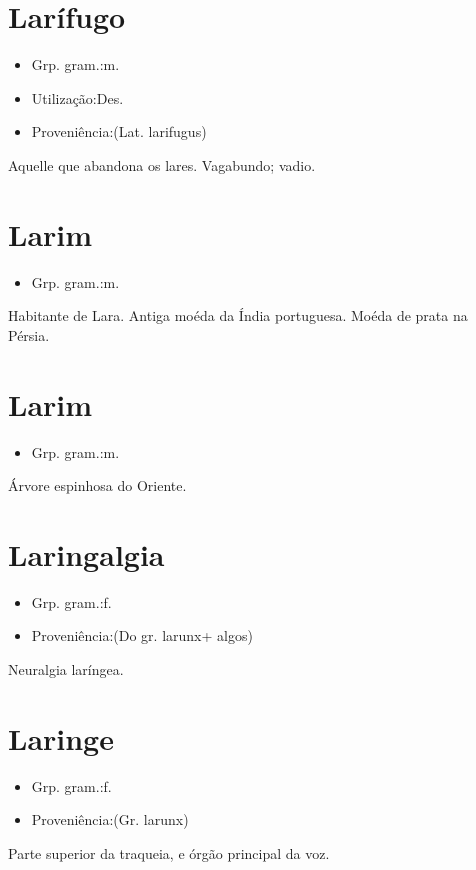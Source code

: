 \section{Larífugo}
\begin{itemize}
\item {Grp. gram.:m.}
\end{itemize}
\begin{itemize}
\item {Utilização:Des.}
\end{itemize}
\begin{itemize}
\item {Proveniência:(Lat. \textunderscore larifugus\textunderscore )}
\end{itemize}
Aquelle que abandona os lares.
Vagabundo; vadio.
\section{Larim}
\begin{itemize}
\item {Grp. gram.:m.}
\end{itemize}
Habitante de Lara.
Antiga moéda da Índia portuguesa.
Moéda de prata na Pérsia.
\section{Larim}
\begin{itemize}
\item {Grp. gram.:m.}
\end{itemize}
Árvore espinhosa do Oriente.
\section{Laringalgia}
\begin{itemize}
\item {Grp. gram.:f.}
\end{itemize}
\begin{itemize}
\item {Proveniência:(Do gr. \textunderscore larunx\textunderscore  + \textunderscore algos\textunderscore )}
\end{itemize}
Neuralgia laríngea.
\section{Laringe}
\begin{itemize}
\item {Grp. gram.:f.}
\end{itemize}
\begin{itemize}
\item {Proveniência:(Gr. \textunderscore larunx\textunderscore )}
\end{itemize}
Parte superior da traqueia, e órgão principal da voz.
